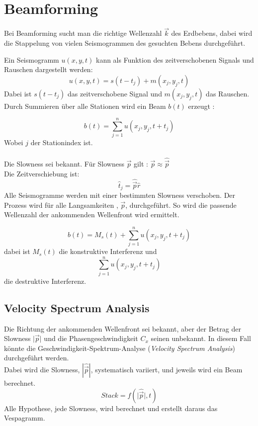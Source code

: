 \section{Beamforming}

Bei Beamforming sucht man die richtige Wellenzahl $\vec{k}$ des Erdbebens, dabei wird die Stappelung von vielen Seismogrammen des gesuchten Bebens durchgeführt. 

Ein Seismogramm $u(x,y,t)$ kann als Funktion des zeitverschobenen Signals und Rauschen dargestellt werden:
\begin{equation}
u(x,y,t) = s(t-t_{j})+m(x_{j},y_{j},t)
\end{equation}
 Dabei ist $s(t-t_{j})$ das zeitverschobene Signal und $m(x_{j},y_{j},t)$ das Rauschen.\\
 Durch Summieren über alle Stationen wird ein Beam $b(t)$ erzeugt :
 
\begin{equation}
 b(t) = \sum_{j=1}^{n} u( x_{j},y_{j},t+t_{j})
\end{equation}
{\small Wobei $j$ der Stationindex ist.}\\\\ 
 Die Slowness sei bekannt. Für Slowness $\vec{p}$ gilt : $ \vec{p}\approx \hat{\vec{p}}$\\
 Die Zeitverschiebung ist: 
 \begin{equation}
 \hat{t}_{j}=\hat{\vec{p}}\hat{r}
 \end{equation}
Alle Seismogramme werden mit einer bestimmten Slowness verschoben. Der Prozess wird für alle Langsamkeiten , $\vec{p}$, durchgeführt. So wird die passende Wellenzahl der ankommenden Wellenfront wird ermittelt. 
 

 \begin{equation}
 b(t) = M_{s}(t)+ \sum_{j=1}^{n} u( x_{j},y_{j},t+t_{j})
 \end{equation}
 dabei ist $M_{s}(t)$ die konstruktive Interferenz und
\[
\sum_{j=1}^{n} u( x_{j},y_{j},t+t_{j})
\]
die destruktive Interferenz.

\subsection{Velocity Spectrum Analysis}
Die Richtung der ankommenden Wellenfront sei bekannt, aber der Betrag der Slowness  $\vert\vec{p}\vert$ und die Phasengeschwindigkeit $C_{x}$ seinen unbekannt.
In diesem Fall könnte die Geschwindigkeit-Spektrum-Analyse (\textit{Velocity Spectrum Analysis}) durchgeführt werden.\\
Dabei wird die Slowness, $|\hat{\vec{p}}|$, systematisch variiert, und jeweils wird ein Beam berechnet.
\[
Stack = f(\vert\hat{\vec{p}}\vert,t)
\]
Alle Hypothese, jede Slowness, wird berechnet und erstellt daraus das Vespagramm. 

